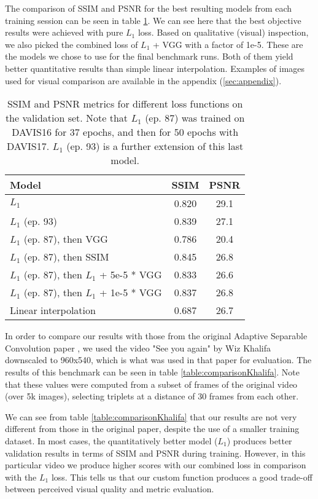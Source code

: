 \documentclass[10pt,twocolumn,letterpaper]{article}
\begin{document}
The comparison of SSIM and PSNR for the best resulting models from each training session can be seen in table \ref{table:comparisonAllModels}. We can see here that the best objective results were achieved with pure $L_1$ loss. Based on qualitative (visual) inspection, we also picked the combined loss of $L_1$ + VGG with a factor of 1e-5. These are the models we chose to use for the final benchmark runs. Both of them yield better quantitative results than simple linear interpolation. Examples of images used for visual comparison are available in the appendix (\ref{sec:appendix}). 

\begin{table}[h]
\centering
\begin{tabular}{|l|c|c|}
\hline
	Model & SSIM & PSNR \\
	\hline
$L_1$                                       & 0.820 & 29.1 \\
$L_1$ (ep. 93)                              & 0.839 & 27.1 \\
$L_1$ (ep. 87), then VGG                    & 0.786 & 20.4  \\
$L_1$ (ep. 87), then SSIM                   & 0.845 & 26.8  \\
$L_1$ (ep. 87), then $L_1$ + 5e-5 * VGG     & 0.833 & 26.6  \\
$L_1$ (ep. 87), then $L_1$ + 1e-5 * VGG     & 0.837 & 26.8  \\
Linear interpolation                        & 0.687 & 26.7  \\
	\hline
\end{tabular}
\vspace{1em}
\caption{SSIM and PSNR metrics for different loss functions on the validation set. Note that $L_1$ (ep. 87) was trained on DAVIS16 for 37 epochs, and then for 50 epochs with DAVIS17. $L_1$ (ep. 93) is a further extension of this last model.}
\label{table:comparisonAllModels}
\end{table}

In order to compare our results with those from the original Adaptive Separable Convolution paper \cite{AdapConv}, we used the video "See you again" by Wiz Khalifa downscaled to 960x540, which is what was used in that paper for evaluation. The results of this benchmark can be seen in table \ref{table:comparisonKhalifa}. Note that these values were computed from a subset of frames of the original video (over 5k images), selecting triplets at a distance of 30 frames from each other.

We can see from table \ref{table:comparisonKhalifa} that our results are not very different from those in the original paper, despite the use of a smaller training dataset. In most cases, the quantitatively better model ($L_1$) produces better validation results in terms of SSIM and PSNR during training. However, in this particular video we produce higher scores with our combined loss in comparison with the $L_1$ loss. This tells us that our custom function produces a good trade-off between perceived visual quality and metric evaluation.  
\end{document}
